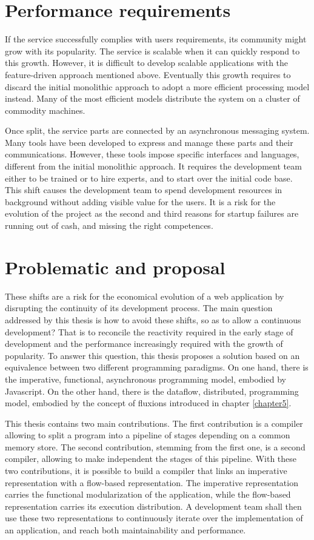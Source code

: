 \section{Performance requirements}

If the service successfully complies with users requirements, its community might grow with its popularity.
The service is scalable when it can quickly respond to this growth.
However, it is difficult to develop scalable applications with the feature-driven approach mentioned above.
Eventually this growth requires to discard the initial monolithic approach to adopt a more efficient processing model instead.
Many of the most efficient models distribute the system on a cluster of commodity machines.

Once split, the service parts are connected by an asynchronous messaging system.
Many tools have been developed to express and manage these parts and their communications.
However, these tools impose specific interfaces and languages, different from the initial monolithic approach.
It requires the development team either to be trained or to hire experts, and to start over the initial code base.
This shift causes the development team to spend development resources in background without adding visible value for the users.
It is a risk for the evolution of the project as the second and third reasons for startup failures are running out of cash, and missing the right competences.

\section{Problematic and proposal}

These shifts are a risk for the economical evolution of a web application by disrupting the continuity of its development process.
The main question addressed by this thesis is how to avoid these shifts, so as to allow a continuous development?
That is to reconcile the reactivity required in the early stage of development and the performance increasingly required with the growth of popularity.
To answer this question, this thesis proposes a solution based on an equivalence between two different programming paradigms.
On one hand, there is the imperative, functional, asynchronous programming model, embodied by Javascript.
On the other hand, there is the dataflow, distributed, programming model, embodied by the concept of fluxions introduced in chapter \ref{chapter5}.

This thesis contains two main contributions.
The first contribution is a compiler allowing to split a program into a pipeline of stages depending on a common memory store.
The second contribution, stemming from the first one, is a second compiler, allowing to make independent the stages of this pipeline.
With these two contributions, it is possible to build a compiler that links an imperative representation with a flow-based representation.
The imperative representation carries the functional modularization of the application, while the flow-based representation carries its execution distribution.
A development team shall then use these two representations to continuously iterate over the implementation of an application, and reach both maintainability and performance.

